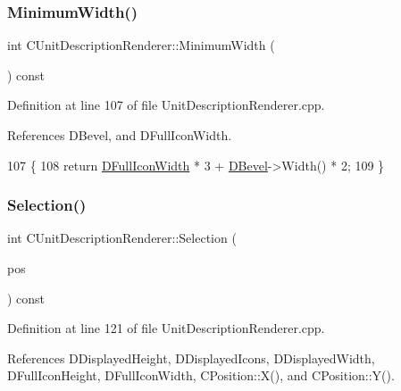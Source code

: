 \subsubsection{\texorpdfstring{Minimum\+Width()}{MinimumWidth()}}
{\footnotesize\ttfamily int C\+Unit\+Description\+Renderer\+::\+Minimum\+Width (\begin{DoxyParamCaption}{ }\end{DoxyParamCaption}) const}



Definition at line 107 of file Unit\+Description\+Renderer.\+cpp.



References D\+Bevel, and D\+Full\+Icon\+Width.


\begin{DoxyCode}
107                                                 \{
108     \textcolor{keywordflow}{return} \hyperlink{classCUnitDescriptionRenderer_a4bd79032fe13b9c09386a24cb8ef7650}{DFullIconWidth} * 3 + \hyperlink{classCUnitDescriptionRenderer_a9f4cd9f9d8dbc5036c885980494db41e}{DBevel}->Width() * 2;
109 \}
\end{DoxyCode}
\hypertarget{classCUnitDescriptionRenderer_a6ef0c9f010b5502def622e6d830795c7}{}\label{classCUnitDescriptionRenderer_a6ef0c9f010b5502def622e6d830795c7} 
\subsubsection{\texorpdfstring{Selection()}{Selection()}}
{\footnotesize\ttfamily int C\+Unit\+Description\+Renderer\+::\+Selection (\begin{DoxyParamCaption}\item[{const \hyperlink{classCPosition}{C\+Position} \&}]{pos }\end{DoxyParamCaption}) const}



Definition at line 121 of file Unit\+Description\+Renderer.\+cpp.



References D\+Displayed\+Height, D\+Displayed\+Icons, D\+Displayed\+Width, D\+Full\+Icon\+Height, D\+Full\+Icon\+Width, C\+Position\+::\+X(), and C\+Position\+::\+Y().



